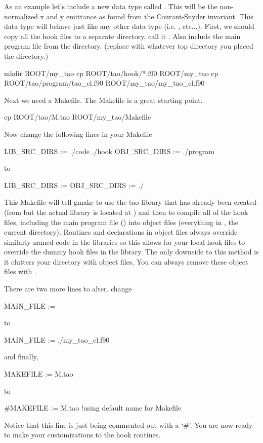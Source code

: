 As an example let's include a new data type called
. This will be the non-normalized x and y
emittance as found from the Courant-Snyder invariant. This data type
will behave just like any other data type (i.e.  ,
 etc...). First, we should copy all the hook files to a
separate directory, call it . Also include the main
program file from the  directory.  (replace
 with whatever top directory you placed the 
directory.)
\begin{example}
  mkdir ROOT/my_tao
  cp ROOT/tao/hook/*.f90 ROOT/my_tao
  cp ROOT/tao/program/tao_cl.f90 ROOT/my_tao/my_tao_cl.f90
\end{example}
Next we need a Makefile. The  
Makefile is a great starting point.
\begin{example}
  cp ROOT/tao/M.tao ROOT/my_tao/Makefile
\end{example}
Now change the following lines in your Makefile
\begin{example}
  LIB\_SRC\_DIRS := ./code ./hook
  OBJ\_SRC\_DIRS := ./program
\end{example}
to
\begin{example}
  LIB\_SRC\_DIRS :=
  OBJ\_SRC\_DIRS := ./
\end{example}
This Makefile will tell gmake to use the tao library that has already
been created (from  but the actual library is located
at )
 and then to compile
all of the hook files, including the main program file
() into object files (everything in , the
current directory).  Routines and declarations in object files always
override similarly named code in the \tao libraries so this allows for
your local hook files to override the dummy hook files in the \tao
library. The only downside to this method is it clutters your
 directory with object files. You can always remove these
object files with .

There are two more lines to alter. change
\begin{example}
  MAIN\_FILE :=
\end{example}
to
\begin{example}
  MAIN\_FILE := ./my\_tao_cl.f90
\end{example}
and finally,
\begin{example}
  MAKEFILE := M.tao
\end{example}
to
\begin{example}
  #MAKEFILE := M.tao !using default name for Makefile
\end{example}
Notice that this line is just being commented out with a `\#'. You are
now ready to make your customizations to the hook routines.

